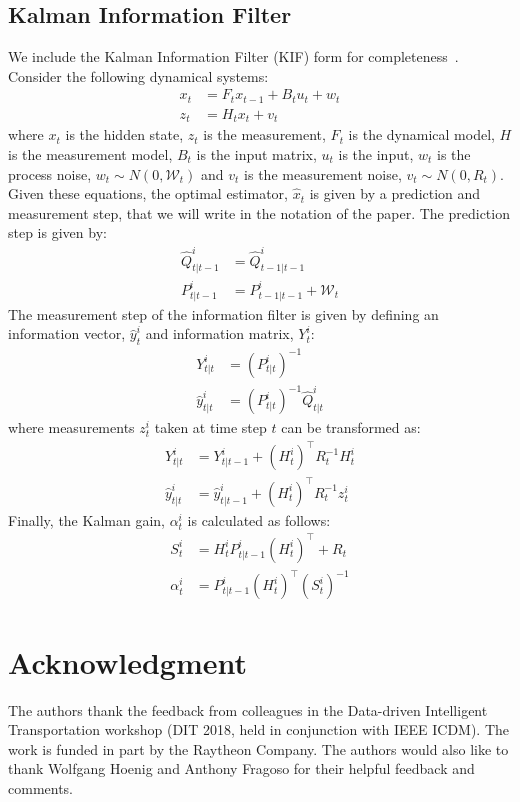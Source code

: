 \documentclass[journal]{IEEEtran}
\begin{document}
\subsection{Kalman Information Filter}\label{sec: KIF}
We include the Kalman Information Filter (KIF) form for completeness~\cite{brown_kalman}. 
Consider the following dynamical systems:
\begin{align*}
    x_t &= F_t x_{t-1} + B_t u_t + w_t \\
    z_t &= H_t x_t + v_t 
\end{align*}
where $x_t$ is the hidden state, $z_t$ is the measurement, $F_t$ is the dynamical model, $H$ is the measurement model, $B_t$ is the input matrix, $u_t$ is the input, $w_t$ is the process noise, $w_t \sim N(0, \mathcal{W}_t)$ and $v_t$ is the measurement noise, $v_t \sim N(0, R_t)$. Given these equations, the optimal estimator, $\hat{x}_t$ is given by a prediction and measurement step, that we will write in the notation of the paper. 
The prediction step is given by:
\begin{align*}
    \hat{Q}^i_{t|t-1} &= \hat{Q}^i_{t-1|t-1} \\
    P^i_{t|t-1} &= P^i_{t-1|t-1} + \mathcal{W}_t 
\end{align*}
The measurement step of the information filter is given by defining an information vector, $\hat{y}^i_t$ and information matrix, $Y^i_t$:
\begin{align*}
    Y_{t|t}^i &= (P^i_{t|t})^{-1} \\
    \hat{y}^i_{t|t} &= (P^i_{t|t})^{-1} \hat{Q}^i_{t|t} 
\end{align*}
where measurements $z_t^i$ taken at time step $t$ can be transformed as:
\begin{align*}
    Y^i_{t|t} &= Y^i_{t|t-1} + (H^i_t)^\intercal R_t^{-1} H^i_t \\
    \hat{y}^i_{t|t} &= \hat{y}^i_{t|t-1} + (H^i_t)^\intercal R_t^{-1} z_t^i
\end{align*}
Finally, the Kalman gain, $\alpha^i_t$ is calculated as follows:
\begin{align*}
    S^i_t &= H^i_t P^i_{t|t-1} (H^i_t)^\intercal + R_t \\
    \alpha^i_t &= P^i_{t|t-1} (H^i_t)^\intercal (S^i_t)^{-1}
\end{align*}

\section*{Acknowledgment}
The authors thank the feedback from colleagues in the Data-driven Intelligent Transportation workshop (DIT 2018, held in conjunction with IEEE ICDM). The work is funded in part by the Raytheon Company. 
The authors would also like to thank Wolfgang Hoenig and Anthony Fragoso for their helpful feedback and comments. 
\end{document}
